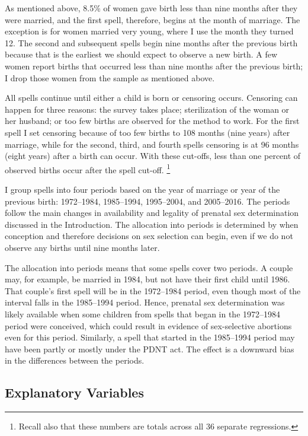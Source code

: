 \documentclass[12pt,letterpaper]{article}
\begin{document}
As mentioned above, 8.5\% of women gave birth less than nine months
after they were married, and the first spell, therefore, begins at the 
month of marriage.
The exception is for women married very young, where I use the month they 
turned 12.
The second and subsequent spells begin nine months after the previous birth 
because that is the earliest we should expect to observe a new birth.
A few women report births that occurred less than nine months 
after the previous birth; I drop those women from the sample as mentioned above.

All spells continue until either a child is born or censoring occurs.
Censoring can happen for three reasons:
the survey takes place;
sterilization of the woman or her husband;
or too few births are observed for the method to work.
For the first spell I set censoring because of too few births to 108 months 
(nine years) after marriage,
while for the second, third, and fourth spells censoring is at 96 months 
(eight years) after a birth can occur.
With these cut-offs, less than one percent of observed births occur after
the spell cut-off.%
\footnote{

Recall also that these numbers are totals across all 36 separate regressions.
}


I group spells into four periods based on the year of marriage
or year of the previous birth:
1972--1984, 1985--1994, 1995--2004, and 2005--2016.
The periods follow the main changes in availability and legality of 
prenatal sex determination discussed in the Introduction.
The allocation into periods is determined by when conception and therefore 
decisions on sex selection can begin, even if we do not observe
any births until nine months later.

The allocation into periods means that some spells cover two periods.
A couple may, for example, be married in 1984, but not have their first 
child until 1986.
That couple's first spell will be in the 1972--1984 period, even though 
most of the interval falls in the 1985--1994 period.
Hence, prenatal sex determination was likely available when some
children from spells that began in the 1972--1984 period were conceived,
which could result in evidence of sex-selective abortions even for this
period.
Similarly, a spell that started in the 1985--1994 period may have been partly 
or mostly under the PDNT act.
The effect is a downward bias in the differences between the periods.

\subsection{Explanatory Variables}
\end{document}
